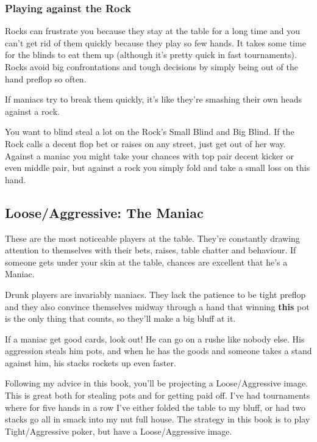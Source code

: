 \subsubsection{Playing against the Rock}

Rocks can frustrate you because they stay at the table for a long time
and you can't get rid of them quickly because they play so few hands.
It takes some time for the blinds to eat them up (although it's
pretty quick in fast tournaments). Rocks avoid big confrontations
and tough decisions by simply being out of the hand preflop so often.

If maniacs try to break them quickly,
it's like they're smashing their own heads against a rock.

You want to blind steal a lot on the Rock's Small Blind and Big Blind.
If the Rock calls a decent flop bet or raises on any street, just get
out of her way. Against a maniac you might take your chances with
top pair decent kicker or even middle pair, but against a rock you
simply fold and take a small loss on this hand.

\subsection{Loose/Aggressive: The Maniac}

These are the most noticeable players at the table. They're constantly
drawing attention to themselves with their bets, raises, table chatter
and behaviour. If someone gets under your skin at the table, chances
are excellent that he's a Maniac.

Drunk players are invariably maniacs. They lack the patience to be
tight preflop and they also convince themselves midway through a
hand that winning \textbf{this} pot is the only thing that counts, so
they'll make a big bluff at it.

If a maniac get good cards, look out! He can go on a rushe like
nobody else. His aggression steals him pots, and when
he has the goods and someone takes a stand against him, his
stacks rockets up even faster.

Following my advice in this book, you'll be projecting a Loose/Aggressive
image. This is great both for stealing pots and for getting paid off.
I've had tournaments where for five hands in a row I've either folded
the table to my bluff, or had two stacks go all in smack into my nut
full house. The strategy in this book is to play Tight/Aggressive
poker, but have a Loose/Aggressive image.


